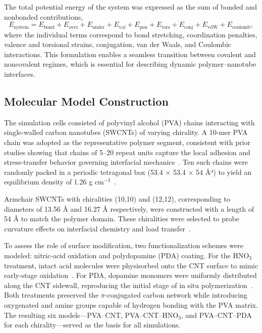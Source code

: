 \documentclass[journal=jacsat,manuscript=article]{achemso}
\begin{document}
The total potential energy of the system was expressed as the sum of bonded and nonbonded contributions,
\begin{equation}
E_\mathrm{system}=E_\mathrm{bond}+E_\mathrm{over}+E_\mathrm{under}+E_\mathrm{val}+E_\mathrm{pen}+E_\mathrm{tors}+E_\mathrm{conj}+E_\mathrm{vdW}+E_\mathrm{coulomb},
\end{equation}
where the individual terms correspond to bond stretching, coordination penalties, valence and torsional strains, conjugation, van der Waals, and Coulombic interactions. This formulation enables a seamless transition between covalent and noncovalent regimes, which is essential for describing dynamic polymer–nanotube interfaces.

\subsection{Molecular Model Construction}

The simulation cells consisted of polyvinyl alcohol (PVA) chains interacting with single‐walled carbon nanotubes (SWCNTs) of varying chirality. A 10-mer PVA chain was adopted as the representative polymer segment, consistent with prior studies showing that chains of 5–20 repeat units capture the local adhesion and stress‐transfer behavior governing interfacial mechanics~\cite{rissanou2018atomistic,hasan2024tailoring}. Ten such chains were randomly packed in a periodic tetragonal box (53.4 × 53.4 × 54 Å³) to yield an equilibrium density of 1.26 g cm$^{-3}$~\cite{hashim2014determination}. 

Armchair SWCNTs with chiralities (10,10) and (12,12), corresponding to diameters of 13.56 Å and 16.27 Å respectively, were constructed with a length of 54 Å to match the polymer domain. These chiralities were selected to probe curvature effects on interfacial chemistry and load transfer~\cite{mori2005chirality,natsuki2004effects}. 

To assess the role of surface modification, two functionalization schemes were modeled: nitric‐acid oxidation and polydopamine (PDA) coating. For the HNO$_3$ treatment, intact acid molecules were physisorbed onto the CNT surface to mimic early‐stage oxidation~\cite{ketolainen2018electronic}. For PDA, dopamine monomers were uniformly distributed along the CNT sidewall, reproducing the initial stage of in situ polymerization~\cite{wang2019preparation}. Both treatments preserved the $\pi$-conjugated carbon network while introducing oxygenated and amine groups capable of hydrogen bonding with the PVA matrix. The resulting six models—PVA–CNT, PVA–CNT–HNO$_3$, and PVA–CNT–PDA for each chirality—served as the basis for all simulations.
\end{document}
